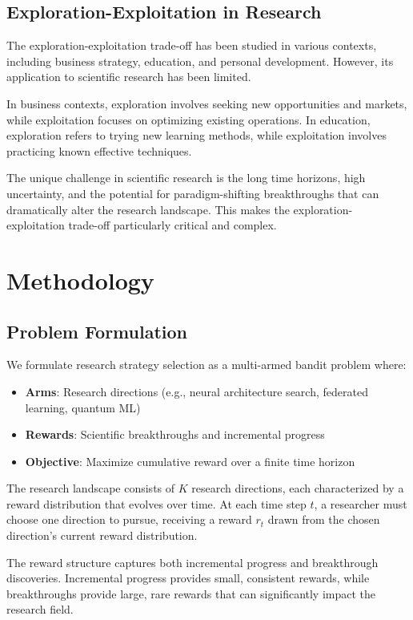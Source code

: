 \documentclass[letterpaper]{article}
\begin{document}
\subsection{Exploration-Exploitation in Research}

The exploration-exploitation trade-off has been studied in various contexts, including business strategy, education, and personal development. However, its application to scientific research has been limited.

In business contexts, exploration involves seeking new opportunities and markets, while exploitation focuses on optimizing existing operations. In education, exploration refers to trying new learning methods, while exploitation involves practicing known effective techniques.

The unique challenge in scientific research is the long time horizons, high uncertainty, and the potential for paradigm-shifting breakthroughs that can dramatically alter the research landscape. This makes the exploration-exploitation trade-off particularly critical and complex.

\section{Methodology}

\subsection{Problem Formulation}

We formulate research strategy selection as a multi-armed bandit problem where:
\begin{itemize}
\item \textbf{Arms}: Research directions (e.g., neural architecture search, federated learning, quantum ML)
\item \textbf{Rewards}: Scientific breakthroughs and incremental progress
\item \textbf{Objective}: Maximize cumulative reward over a finite time horizon
\end{itemize}

The research landscape consists of $K$ research directions, each characterized by a reward distribution that evolves over time. At each time step $t$, a researcher must choose one direction to pursue, receiving a reward $r_t$ drawn from the chosen direction's current reward distribution.

The reward structure captures both incremental progress and breakthrough discoveries. Incremental progress provides small, consistent rewards, while breakthroughs provide large, rare rewards that can significantly impact the research field.
\end{document}
